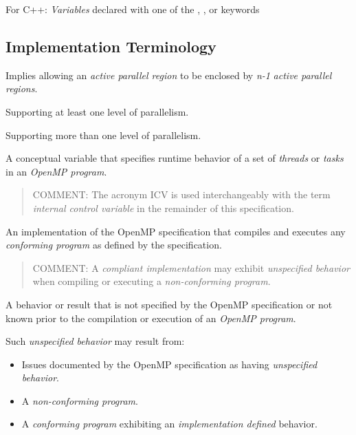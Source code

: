 \glossarydefstart
For C++: \emph{Variables} declared with one of the , , or  keywords
\glossarydefend





\subsection{Implementation Terminology}
\label{subsec:Implementation Terminology}
\glossarydefstart
Implies allowing an \emph{active parallel region} to be enclosed by \emph{n-1} \emph{active parallel
regions}.
\glossarydefend

\glossarydefstart
Supporting at least one level of parallelism.
\glossarydefend
\bigskip

\glossarydefstart
Supporting more than one level of parallelism.
\glossarydefend
\bigskip

\glossarydefstart
A conceptual variable that specifies runtime behavior of a set of \emph{threads} or \emph{tasks}
in an \emph{OpenMP program}.

\begin{quote}
COMMENT: The acronym ICV is used interchangeably with the term \emph{internal
control variable} in the remainder of this specification.
\end{quote}
\glossarydefend

\glossarydefstart
An implementation of the OpenMP specification that compiles and executes any
\emph{conforming program} as defined by the specification.

\begin{quote}
COMMENT: A \emph{compliant implementation} may exhibit \emph{unspecified behavior} when
compiling or executing a \emph{non-conforming program}.
\end{quote}
\glossarydefend

\glossarydefstart
A behavior or result that is not specified by the OpenMP specification or not
known prior to the compilation or execution of an \emph{OpenMP program}.

Such \emph{unspecified behavior} may result from:

\begin{itemize}
\item Issues documented by the OpenMP specification as having \emph{unspecified
behavior}.

\item A \emph{non-conforming program}.

\item A \emph{conforming program} exhibiting an \emph{implementation defined} behavior.
\end{itemize}
\glossarydefend

